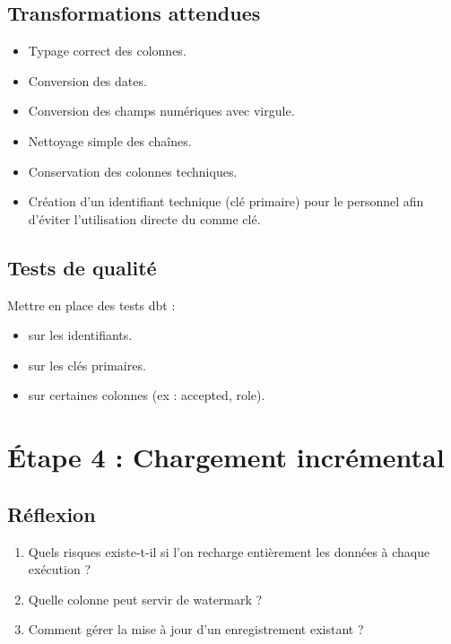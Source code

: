 \documentclass[11pt,a4paper]{article}
\begin{document}
\subsection*{Transformations attendues}

\begin{itemize}
  \item Typage correct des colonnes.
  \item Conversion des dates.
  \item Conversion des champs numériques avec virgule.
  \item Nettoyage simple des chaînes.
  \item Conservation des colonnes techniques.
  \item Création d’un identifiant technique (clé primaire) pour le personnel
  afin d’éviter l’utilisation directe du  comme clé.
\end{itemize}

\subsection*{Tests de qualité}

Mettre en place des tests dbt :

\begin{itemize}
  \item {} sur les identifiants.
  \item {} sur les clés primaires.
  \item {} sur certaines colonnes (ex : accepted, role).
\end{itemize}



\section{Étape 4 : Chargement incrémental}

\subsection*{Réflexion}

\begin{enumerate}
  \item Quels risques existe-t-il si l’on recharge entièrement les données à chaque exécution ?
  \item Quelle colonne peut servir de watermark ?
  \item Comment gérer la mise à jour d’un enregistrement existant ?
\end{enumerate}
\end{document}
